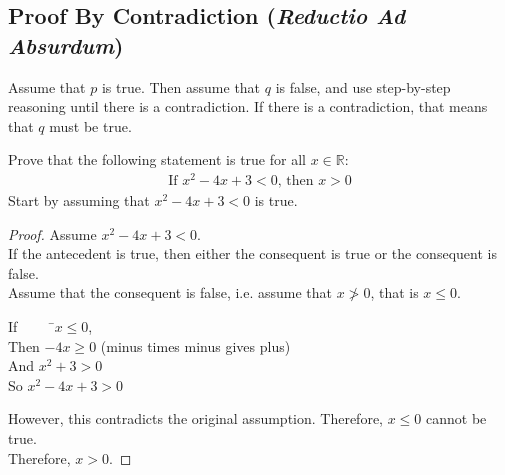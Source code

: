 \documentclass[\main/notes.tex]{subfiles}
\begin{document}
			\subsection[Proof By Contradiction]{Proof By Contradiction (\emph{Reductio Ad Absurdum})}
				Assume that $p$ is true. Then assume that $q$ is false, and use step-by-step reasoning until there is a contradiction. If there is a contradiction, that means that $q$ must be true.
				\begin{example}
					Prove that the following statement is true for all $x \in \mathbb{R}$:
					\begin{align*}
						\text{If } x^{2} - 4x + 3 < 0 \text{, then } x > 0
					\end{align*}
					Start by assuming that $x^{2} - 4x + 3 < 0$ is true.
					\begin{proof}
						Assume $x^{2} - 4x + 3 < 0$.\\
						If the antecedent is true, then either the consequent is true or the consequent is false.\\
						Assume that the consequent is false, i.e. assume that $x \not > 0$, that is $x \leq 0$.
						\begin{tabbing}
							If $\qquad$ \=$x \leq 0$,\\
							Then \>$-4x \geq 0$ (minus times minus gives plus)\\
							And \>$x^{2} + 3 > 0$\\
							So \>$x^{2} - 4x + 3 > 0$
						\end{tabbing}
						However, this contradicts the original assumption. Therefore, $x \leq 0$ cannot be true.\\
						Therefore, $x > 0$.
					\end{proof}
				\end{example}
\end{document}
